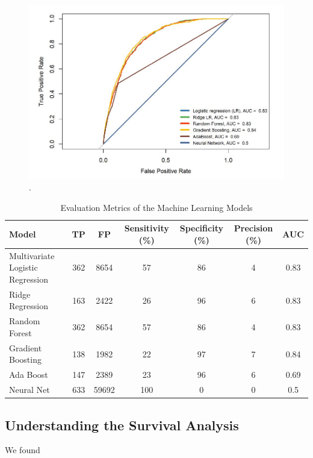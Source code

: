 \documentclass[twoside,10.5pt]{article}
\begin{document}
\begin{figure}[htp]
\centering
\includegraphics[width=12cm]{images/auc_curves.JPG}
\caption{.}
\label{fig:auc_curves}
\end{figure}


\begin{table}[h!]
  \begin{center}
    \caption{Evaluation Metrics of the Machine Learning Models}
    \label{tab:metrics}
    \begin{tabular}{l|c|c|c|c|c|c}
      \textbf{Model} & \textbf{TP} & \textbf{FP} & \textbf{Sensitivity (\%)} & \textbf{Specificity (\%)} & \textbf{Precision (\%)} & \textbf{AUC}\\
      \hline
      Multivariate Logistic Regression & 362 & 8654 & 57 & 86 & 4 & 0.83\\
      Ridge Regression & 163 & 2422 & 26 & 96 & 6 & 0.83\\
      Random Forest & 362 & 8654 & 57 & 86 & 4 & 0.83\\
      Gradient Boosting & 138 & 1982 & 22 & 97 & 7 & 0.84\\
      Ada Boost & 147 & 2389 & 23 & 96 & 6 & 0.69\\
      Neural Net & 633 & 59692 & 100 & 0 & 0 & 0.5\\
      \hline
    \end{tabular}
  \end{center}
\end{table}

\newpage

\subsection{Understanding the Survival Analysis}
We found
\end{document}
